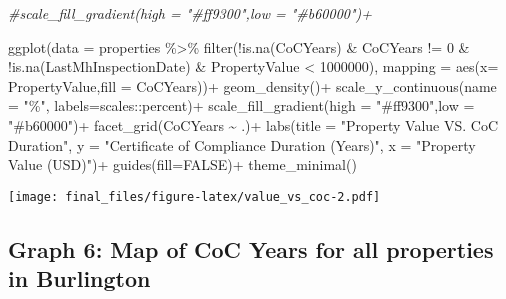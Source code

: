 \documentclass[
]{article}
\newenvironment{Shaded}{\begin{snugshade}}{\end{snugshade}}
\newcommand{\AttributeTok}[1]{\textcolor[rgb]{0.77,0.63,0.00}{#1}}
\newcommand{\CommentTok}[1]{\textcolor[rgb]{0.56,0.35,0.01}{\textit{#1}}}
\newcommand{\ConstantTok}[1]{\textcolor[rgb]{0.00,0.00,0.00}{#1}}
\newcommand{\DecValTok}[1]{\textcolor[rgb]{0.00,0.00,0.81}{#1}}
\newcommand{\FunctionTok}[1]{\textcolor[rgb]{0.00,0.00,0.00}{#1}}
\newcommand{\NormalTok}[1]{#1}
\newcommand{\SpecialCharTok}[1]{\textcolor[rgb]{0.00,0.00,0.00}{#1}}
\newcommand{\StringTok}[1]{\textcolor[rgb]{0.31,0.60,0.02}{#1}}
\begin{document}
\begin{Shaded}
\begin{Highlighting}[]
\CommentTok{\#scale\_fill\_gradient(high = "\#ff9300",low = "\#b60000")+}

\FunctionTok{ggplot}\NormalTok{(}\AttributeTok{data =}\NormalTok{ properties }\SpecialCharTok{\%\textgreater{}\%} 
               \FunctionTok{filter}\NormalTok{(}\SpecialCharTok{!}\FunctionTok{is.na}\NormalTok{(CoCYears) }\SpecialCharTok{\&}\NormalTok{ CoCYears }\SpecialCharTok{!=} \DecValTok{0} \SpecialCharTok{\&} \SpecialCharTok{!}\FunctionTok{is.na}\NormalTok{(LastMhInspectionDate) }\SpecialCharTok{\&}\NormalTok{ PropertyValue }\SpecialCharTok{\textless{}} \DecValTok{1000000}\NormalTok{), }
       \AttributeTok{mapping =} \FunctionTok{aes}\NormalTok{(}\AttributeTok{x=}\NormalTok{ PropertyValue,}\AttributeTok{fill =}\NormalTok{ CoCYears))}\SpecialCharTok{+}
  \FunctionTok{geom\_density}\NormalTok{()}\SpecialCharTok{+}
  \FunctionTok{scale\_y\_continuous}\NormalTok{(}\AttributeTok{name =} \StringTok{"\%"}\NormalTok{, }\AttributeTok{labels=}\NormalTok{scales}\SpecialCharTok{::}\NormalTok{percent)}\SpecialCharTok{+}
  \FunctionTok{scale\_fill\_gradient}\NormalTok{(}\AttributeTok{high =} \StringTok{"\#ff9300"}\NormalTok{,}\AttributeTok{low =} \StringTok{"\#b60000"}\NormalTok{)}\SpecialCharTok{+}
  \FunctionTok{facet\_grid}\NormalTok{(CoCYears }\SpecialCharTok{\textasciitilde{}}\NormalTok{ .)}\SpecialCharTok{+}
  \FunctionTok{labs}\NormalTok{(}\AttributeTok{title =} \StringTok{"Property Value VS. CoC Duration"}\NormalTok{,}
             \AttributeTok{y =} \StringTok{"Certificate of Compliance Duration (Years)"}\NormalTok{,}
             \AttributeTok{x =} \StringTok{"Property Value (USD)"}\NormalTok{)}\SpecialCharTok{+}
        \FunctionTok{guides}\NormalTok{(}\AttributeTok{fill=}\ConstantTok{FALSE}\NormalTok{)}\SpecialCharTok{+}
        \FunctionTok{theme\_minimal}\NormalTok{()}
\end{Highlighting}
\end{Shaded}

\texttt{[image: final\_files/figure-latex/value\_vs\_coc-2.pdf]}

\hypertarget{graph-6-map-of-coc-years-for-all-properties-in-burlington}{%
\subsection{Graph 6: Map of CoC Years for all properties in
Burlington}\label{graph-6-map-of-coc-years-for-all-properties-in-burlington}}
\end{document}
